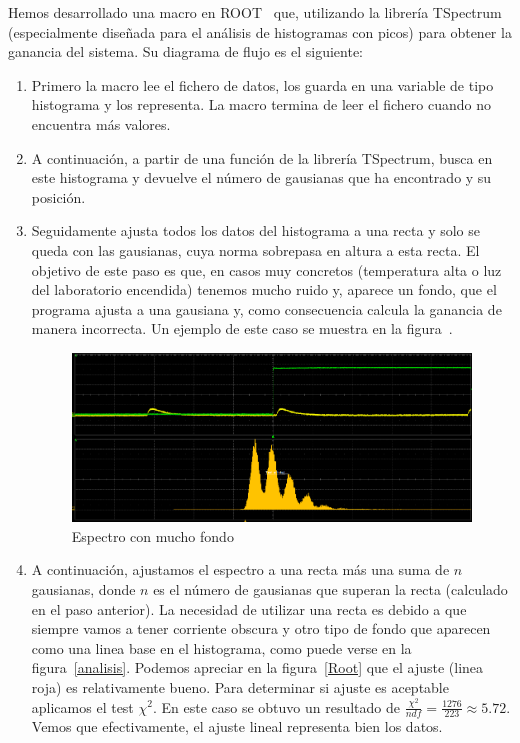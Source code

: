 Hemos desarrollado una macro en ROOT~\cite{ROOT} que, utilizando la librería TSpectrum (especialmente diseñada para el análisis de histogramas con picos) para obtener la ganancia del sistema. Su diagrama de flujo es el siguiente:
\begin{enumerate}
\item {} Primero la macro lee el fichero de datos, los guarda en una variable de tipo histograma y los representa. La macro termina de leer el fichero cuando no encuentra más valores.

\item {} A continuación, a partir de una función de la librería TSpectrum, busca en este histograma y devuelve el número de gausianas que ha encontrado y su posición.

\item {} Seguidamente ajusta todos los datos del histograma a una recta y solo se queda con las gausianas, cuya norma sobrepasa en altura a esta recta. El objetivo de este paso es que, en casos muy concretos (temperatura alta o luz del laboratorio encendida) tenemos mucho ruido y, aparece un fondo,  que el programa ajusta a una gausiana y, como consecuencia calcula la ganancia de manera incorrecta. Un ejemplo de este caso se muestra en la figura~\cite{fondogrande}.

\begin{figure}[hbtp]
\centering
\includegraphics[scale=0.4]{fondogaussiano.png}
\caption{Espectro con mucho fondo\label{fondogrande}}
\end{figure}

\item {} A continuación, ajustamos el espectro a una recta más una suma de $n$ gausianas, donde $n$ es el número de gausianas que superan la recta (calculado en el paso anterior). La necesidad de utilizar una recta es debido a que siempre vamos a tener corriente obscura y otro tipo de fondo que aparecen como una linea base en el histograma, como puede verse en la figura~\ref{analisis}. Podemos apreciar en la figura~\ref{Root} que el ajuste (linea roja) es relativamente bueno. Para determinar si ajuste es aceptable aplicamos el test $\chi^2$. En este caso se obtuvo un resultado de $\frac{\chi^2}{ndf}=\frac{1276}{223}\approx 5.72$. Vemos que efectivamente, el ajuste lineal representa bien los datos.


\end{enumerate}
